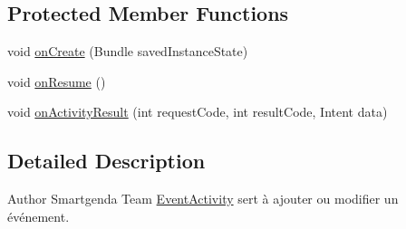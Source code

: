 \subsection*{Protected Member Functions}
\begin{DoxyCompactItemize}
\item 
void \hyperlink{classcom_1_1agenda_1_1ter_1_1smartgenda_1_1_event_activity_a842c164110e2082025ac8091e002ea8b}{on\-Create} (Bundle saved\-Instance\-State)
\item 
void \hyperlink{classcom_1_1agenda_1_1ter_1_1smartgenda_1_1_event_activity_af16a5b60ebe179f04609d53a6c356d7b}{on\-Resume} ()
\item 
void \hyperlink{classcom_1_1agenda_1_1ter_1_1smartgenda_1_1_event_activity_a399b9299a13bded846236a44569f9f71}{on\-Activity\-Result} (int request\-Code, int result\-Code, Intent data)
\end{DoxyCompactItemize}


\subsection{Detailed Description}
\begin{DoxyAuthor}{Author}
Smartgenda Team \hyperlink{classcom_1_1agenda_1_1ter_1_1smartgenda_1_1_event_activity}{Event\-Activity} sert à ajouter ou modifier un événement. 
\end{DoxyAuthor}


